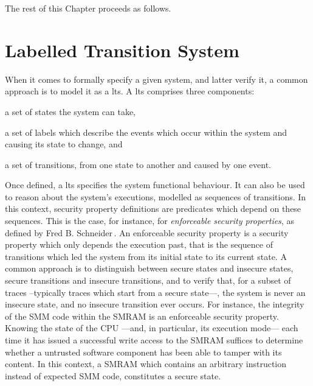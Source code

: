 The rest of this Chapter proceeds as follows.
%

\section{Labelled Transition System} %

When it comes to formally specify a given system, and latter verify it, a common
approach is to model it as a \ac{lts}.
%
A \ac{lts} comprises three components:
%
\begin{inparaenum}[(1)]
%
\item a set of states the system can take,
%
\item a set of labels which describe the events which occur within the system
  and causing its state to change, and
%
\item a set of transitions, from one state to another and caused by one event.
%
\end{inparaenum}

Once defined, a \ac{lts} specifies the system functional behaviour.
%
It can also be used to reason about the system's executions, modelled as
sequences of transitions.
%
In this context, security property definitions are predicates which depend on
these sequences.
%
This is the case, for instance, for \emph{enforceable security properties}, as
defined by Fred B. Schneider\,\cite{schneider2000enforceable}.
%
An enforceable security property is a security property which only depends the
execution past, that is the sequence of transitions which led the system from
its initial state to its current state.
%
A common approach is to distinguish between secure states and insecure states,
secure transitions and insecure transitions, and to verify that, for a subset of
traces --typically traces which start from a secure state---, the system is
never an insecure state, and no insecure transition ever occurs.
%
For instance, the integrity of the SMM code within the SMRAM is an enforceable
security property.
%
Knowing the state of the CPU ---and, in particular, its execution mode--- each
time it has issued a successful write access to the SMRAM suffices to determine
whether a untrusted software component has been able to tamper with its content.
%
In this context, a SMRAM which contains an arbitrary instruction instead of
expected SMM code, constitutes a secure state.

